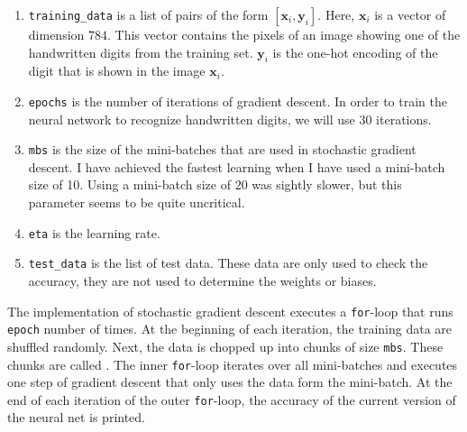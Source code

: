 \begin{enumerate}
\item \texttt{training\_data} is a list of pairs of the form $[\mathbf{x}_i, \mathbf{y}_i]$.
      Here, $\mathbf{x}_i$ is a vector of dimension $784$.  This vector contains the pixels of an image showing
      one of the handwritten digits from the training set.  $\mathbf{y}_i$ is the one-hot encoding of the digit
      that is shown in the image $\mathbf{x}_i$.
\item \texttt{epochs} is the number of iterations of gradient descent.  In order to train the neural network to
      recognize handwritten digits, we will use 30 iterations.
\item \texttt{mbs} is the size of the mini-batches that are used in stochastic gradient descent.
      I have achieved the fastest learning when I have used a mini-batch size of 10.  Using a mini-batch size
      of 20 was sightly slower, but this parameter seems to be quite uncritical.
\item \texttt{eta} is the learning rate.
\item \texttt{test\_data} is the list of test data.  These data are only used to check the accuracy, they are
      not used to determine the weights or biases.
\end{enumerate}
The implementation of stochastic gradient descent executes a \texttt{for}-loop that runs \texttt{epoch} number
of times.  At the beginning of each iteration, the training data are shuffled randomly.  Next, the data is
chopped up into chunks of size \texttt{mbs}.  These chunks are called .  The inner
\texttt{for}-loop iterates over all mini-batches and executes one step of gradient descent that only uses the
data form the mini-batch.  At the end of each iteration of the outer \texttt{for}-loop, the accuracy of the
current version of the neural net is printed.

